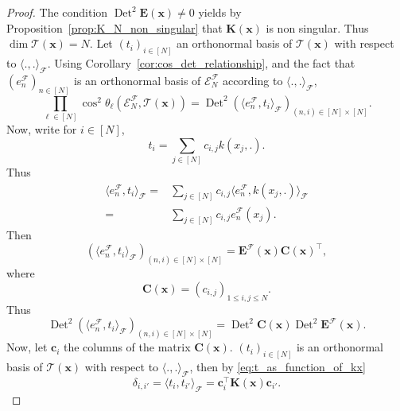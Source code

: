 \documentclass[twoside,11pt]{book}
\DeclareMathOperator{\Det}{Det}
\DeclareMathOperator{\Tran}{\intercal}
\begin{document}
\begin{proof}
The condition $\Det^{2} \bm{E}(\bm{x}) \neq 0$ yields by Proposition~\ref{prop:K_N_non_singular} that $\bm{K}(\bm{x})$ is non singular. Thus $\dim \mathcal{T}(\bm{x}) = N$. Let $(t_{i})_{i \in [N]}$ an orthonormal basis of $\mathcal{T}(\bm{x})$ with respect to $\langle ., . \rangle_{\mathcal{F}}$.
%
Using Corollary~\ref{cor:cos_det_relationship}, and the fact that $(e_{n}^{\mathcal{F}})_{n \in [N]}$ is an orthonormal basis of $\mathcal{E}^{\mathcal{F}}_{N}$ according to $\langle ., . \rangle_{\mathcal{F}}$,
\begin{equation}\label{eq:prod_cos_det_E}
\prod\limits_{\ell \in [N]} \cos^{2} \theta_{\ell} \left(\mathcal{E}^{\mathcal{F}}_{N}, \mathcal{T}(\bm{x}) \right) = \Det^{2} (\langle e_{n}^{\mathcal{F}}, t_{i} \rangle_{\mathcal{F}})_{(n,i) \in [N]\times[N]}.
\end{equation}
Now, write for $i \in [N]$,
\begin{equation}\label{eq:t_as_function_of_kx}
t_{i} = \sum\limits_{j \in [N]} c_{i,j} k(x_{j},.).
\end{equation}
%
Thus
\begin{align}
\langle e_{n}^{\mathcal{F}}, t_{i} \rangle_{\mathcal{F}} = & \sum\limits_{j \in [N]} c_{i,j} \langle e_{n}^{\mathcal{F}}, k(x_{j},.) \rangle_{\mathcal{F}} \\
= &\sum\limits_{j \in [N]} c_{i,j}  e_{n}^{\mathcal{F}}(x_{j}).
\end{align}
%
Then
\begin{equation}
(\langle e_{n}^{\mathcal{F}}, t_{i} \rangle_{\mathcal{F}})_{(n,i) \in [N]\times[N]} = \bm{E}^{\mathcal{F}}(\bm{x}) \bm{C}(\bm{x})^{\Tran} ,
\end{equation}
where
\begin{equation}
\bm{C}(\bm{x}) = (c_{i,j})_{1 \leq i,j \leq N}.
\end{equation}
%
Thus
\begin{equation}\label{eq:AN_times_EN}
\Det^{2} (\langle e_{n}^{\mathcal{F}}, t_{i} \rangle_{\mathcal{F}})_{(n,i) \in [N]\times[N]} = \Det^{2} \bm{C}(\bm{x}) \Det^{2} \bm{E}^{\mathcal{F}}(\bm{x}).
\end{equation}
Now, let $\bm{c}_{i}$ the columns of the matrix $\bm{C}(\bm{x})$. $(t_{i})_{i \in [N]}$ is an orthonormal basis of $\mathcal{T}(\bm{x})$ with respect to $\langle .,. \rangle_{\mathcal{F}}$, then by \eqref{eq:t_as_function_of_kx}
\begin{equation}
  \delta_{i,i'} = \langle t_{i}, t_{i'} \rangle_{\mathcal{F}} = \bm{c}_{i}^{\Tran} \bm{K}(\bm{x}) \bm{c}_{i'}  .

\end{equation}
\end{proof}
\end{document}
